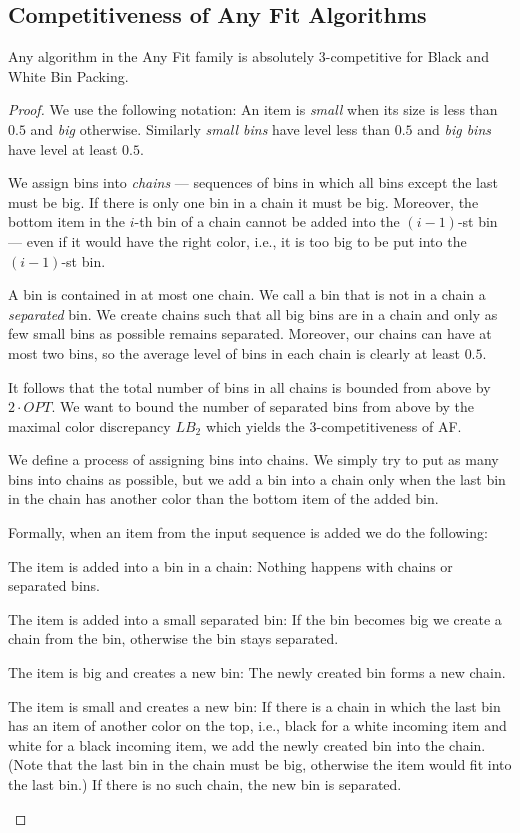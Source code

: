 \documentclass[11pt,a4paper]{article}
\def\vari#1{\mathit{#1}}
\begin{document}
\subsection{Competitiveness of Any Fit Algorithms} \label{sec:AF-BWBP}
\begin{theorem}
\label{thm:AFcomp}
Any algorithm in the Any Fit family is absolutely $3$-competitive for
Black and White Bin Packing.
\end{theorem}

\begin{proof}
We use the following notation: An item is \textit{small}
when its size is less than $0.5$ and \textit{big} otherwise.
Similarly \textit{small bins} have level less than $0.5$ and \textit{big bins} have level at least $0.5$.

We assign bins into \textit{chains} --- sequences of bins in which all bins except the last must be big.
If there is only one bin in a chain it must be big.
Moreover, the bottom item in the $i$-th bin of a chain cannot be added into the $(i- 1)$-st bin ---
even if it would have the right color, i.e., it is too big to be put into the $(i- 1)$-st bin.

A bin is contained in at most one chain. We call a bin that is not in a chain a \textit{separated} bin.
We create chains such that all big bins are in a chain and only as few small bins as possible remains separated.
Moreover, our chains can have at most two bins, so the average level
of bins in each chain is clearly at least $0.5$.

It follows that the total number of bins in all chains
is bounded from above by $2 \cdot \vari{OPT}$.
We want to bound the number of separated bins from above by the maximal color discrepancy $\vari{LB_2}$
which yields the $3$-competitiveness of AF.

We define a process of assigning bins into chains. 
We simply try to put as many bins into chains as possible,
but we add a bin into a chain only when the last bin
in the chain has another color than the bottom item of the added bin.

Formally, when an item from the input sequence is added we do the following:
\begin{compactitem}
\item The item is added into a bin in a chain: Nothing happens with chains or separated bins.
\item The item is added into a small separated bin: If the bin becomes big we create a chain from the bin,
otherwise the bin stays separated.
\item The item is big and creates a new bin: The newly created bin forms a new chain.
\item The item is small and creates a new bin:
If there is a chain in which the last bin has an item of another color on the top, i.e., black for a white incoming item and white for a black incoming item,
we add the newly created bin into the chain. (Note that the last bin in the chain must be big,
otherwise the item would fit into the last bin.)
If there is no such chain, the new bin is separated.
\end{compactitem}


\end{proof}
\end{document}
